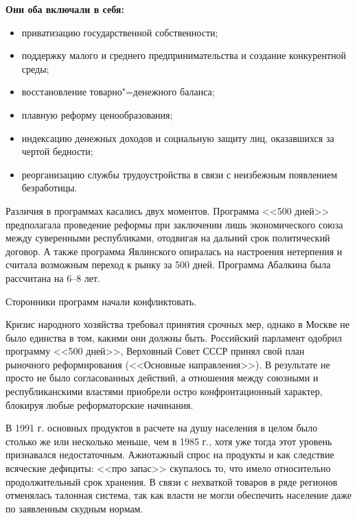  \textbf{Они оба включали в себя:}

\begin{itemize}
    \item приватизацию государственной собственности;
    \item поддержку малого и среднего предпринимательства и создание конкурентной среды;
    \item восстановление товарно"=денежного баланса;
    \item плавную реформу ценообразования;
    \item индексацию денежных доходов и социальную защиту лиц, оказавшихся за чертой бедности;
    \item реорганизацию службы трудоустройства в связи с неизбежным появлением безработицы.
\end{itemize}

Различия в программах касались двух моментов. Программа <<500 дней>> предполагала проведение реформы при заключении лишь экономического союза между суверенными республиками, отодвигая на дальний срок политический договор. А также программа Явлинского опиралась на настроения нетерпения и считала возможным переход к рынку за 500 дней. Программа Абалкина была рассчитана на 6--8 лет.

Сторонники программ начали конфликтовать.

Кризис народного хозяйства требовал принятия срочных мер, однако в Москве не было единства в том, какими они должны быть. Российский парламент одобрил программу <<500 дней>>, Верховный Совет СССР принял свой план рыночного реформирования (<<Основные направления>>). В результате не просто не было согласованных действий, а отношения между союзными и республиканскими властями приобрели остро конфронтационный характер, блокируя любые реформаторские начинания. 

В 1991 г. основных продуктов в расчете на душу населения в целом было столько же или несколько меньше, чем в 1985 г., хотя уже тогда этот уровень признавался недостаточным. Ажиотажный спрос на продукты и как следствие всяческие дефициты: <<про запас>> скупалось то, что имело относительно продолжительный срок хранения. В связи с нехваткой товаров в ряде регионов отменялась талонная система, так как власти не могли обеспечить население даже по заявленным скудным нормам.
